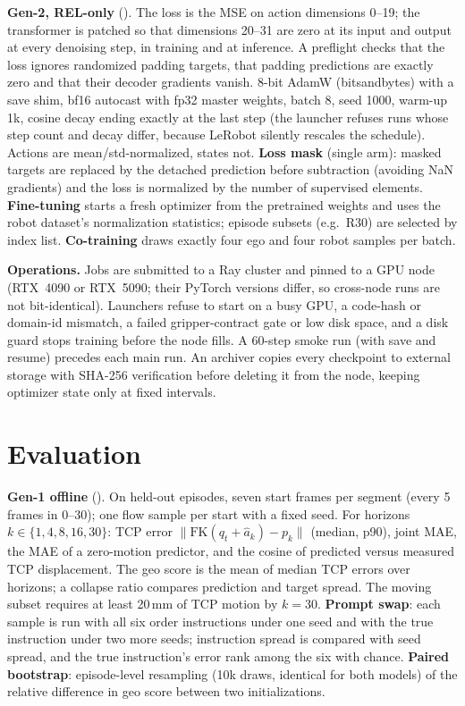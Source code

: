 \documentclass[conference,10pt]{IEEEtran}
\newcommand{\mm}{\,mm\xspace}
\begin{document}
\textbf{Gen-2, REL-only} (). The loss is the MSE on action dimensions 0--19; the transformer is patched so that
dimensions 20--31 are zero at its input and output at every denoising step, in training and at inference. A preflight checks that the
loss ignores randomized padding targets, that padding predictions are exactly zero and that their decoder gradients vanish. 8-bit
AdamW (bitsandbytes) with a save shim, bf16 autocast with fp32 master weights, batch 8, seed 1000, warm-up 1k, cosine decay ending
exactly at the last step (the launcher refuses runs whose step count and decay differ, because LeRobot silently rescales the
schedule). Actions are mean/std-normalized, states not. \textbf{Loss mask} (single arm): masked targets are replaced by the detached
prediction before subtraction (avoiding NaN gradients) and the loss is normalized by the number of supervised elements.
\textbf{Fine-tuning} starts a fresh optimizer from the pretrained weights and uses the robot dataset's normalization statistics;
episode subsets (e.g.\ R30) are selected by index list. \textbf{Co-training} draws exactly four ego and four robot samples per batch.

\textbf{Operations.} Jobs are submitted to a Ray cluster and pinned to a GPU node (RTX~4090 or RTX~5090; their PyTorch versions
differ, so cross-node runs are not bit-identical). Launchers refuse to start on a busy GPU, a code-hash or domain-id mismatch, a
failed gripper-contract gate or low disk space, and a disk guard stops training before the node fills. A 60-step smoke run (with
save and resume) precedes each main run. An archiver copies every checkpoint to external storage with SHA-256 verification before
deleting it from the node, keeping optimizer state only at fixed intervals.

\section{Evaluation}\label{sec:eval}
\textbf{Gen-1 offline} (). On held-out episodes, seven start frames per segment (every 5 frames
in 0--30); one flow sample per start with a fixed seed. For horizons $k\in\{1,4,8,16,30\}$: TCP error $\lVert\mathrm{FK}(q_t+\hat
a_k)-p_k\rVert$ (median, p90), joint MAE, the MAE of a zero-motion predictor, and the cosine of predicted versus measured TCP
displacement. The geo score is the mean of median TCP errors over horizons; a collapse ratio compares prediction and target spread.
The moving subset requires at least 20\mm{} of TCP motion by $k{=}30$. \textbf{Prompt swap}: each sample is run with all six order
instructions under one seed and with the true instruction under two more seeds; instruction spread is compared with seed spread,
and the true instruction's error rank among the six with chance. \textbf{Paired bootstrap}: episode-level resampling (10k draws,
identical for both models) of the relative difference in geo score between two initializations.
\end{document}
